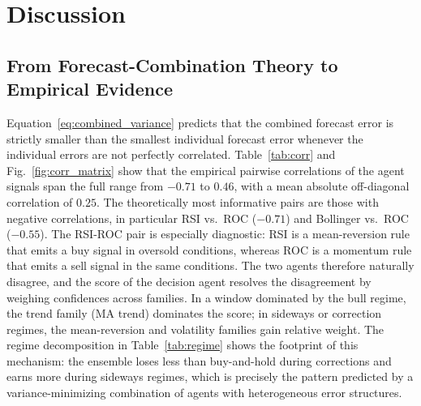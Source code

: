 \documentclass{ieeeaccess}
\newcommand{\CorrMeanAbs}{\ensuremath{0.25}}
\newcommand{\CorrMin}{\ensuremath{-0.71}}
\newcommand{\CorrMax}{\ensuremath{0.46}}
\begin{document}
\section{Discussion}
\label{sec:discussion}

\subsection{From Forecast-Combination Theory to Empirical Evidence}

Equation~\eqref{eq:combined_variance} predicts that the combined forecast error is strictly smaller than the smallest individual forecast error whenever the individual errors are not perfectly correlated. Table~\ref{tab:corr} and Fig.~\ref{fig:corr_matrix} show that the empirical pairwise correlations of the agent signals span the full range from $\CorrMin{}$ to $\CorrMax{}$, with a mean absolute off-diagonal correlation of $\CorrMeanAbs{}$. The theoretically most informative pairs are those with negative correlations, in particular RSI vs.\ ROC ($\CorrMin{}$) and Bollinger vs.\ ROC ($-0.55$). The RSI-ROC pair is especially diagnostic: RSI is a mean-reversion rule that emits a buy signal in oversold conditions, whereas ROC is a momentum rule that emits a sell signal in the same conditions. The two agents therefore naturally disagree, and the score of the decision agent resolves the disagreement by weighing confidences across families. In a window dominated by the bull regime, the trend family (MA trend) dominates the score; in sideways or correction regimes, the mean-reversion and volatility families gain relative weight. The regime decomposition in Table~\ref{tab:regime} shows the footprint of this mechanism: the ensemble loses less than buy-and-hold during corrections and earns more during sideways regimes, which is precisely the pattern predicted by a variance-minimizing combination of agents with heterogeneous error structures.
\end{document}
